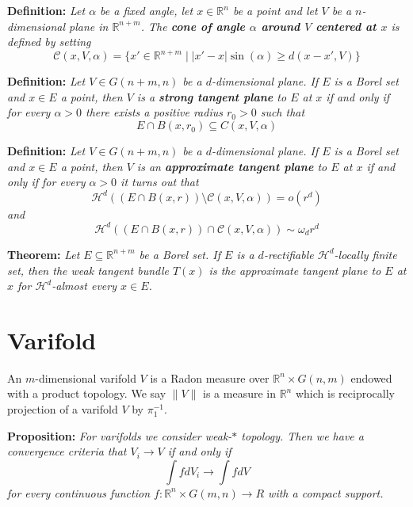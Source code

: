 \documentclass{article}
\begin{document}
\textbf{Definition:} \textit{Let $\alpha$ be a fixed angle, let $x\in\mathbb R^n$
be a point and let $V$ be a $n$-dimensional plane in $\mathbb R^{n+m}$. The \textbf{
cone of angle $\alpha$ around $V$ centered at $x$} is defined by setting
\[\mathcal C(x,V,\alpha)=\{x'\in\mathbb R^{n+m}\;|\; |x′−x|\sin(\alpha)\geq d(x−x′, V)\}\]
}

\vspace{2ex}
\textbf{Definition:} \textit{Let $V\in G(n+m, n)$ be a $d$-dimensional plane.
If $E$ is a Borel set and $x\in E$ a point, then $V$ is a \textbf{strong tangent plane}
to $E$ at $x$ if and only if for every $\alpha >0$ there exists a positive
radius $r_0 >0$ such that
\[E∩B(x, r_0)\subseteq C(x, V, \alpha)\]
}

\vspace{2ex}
\textbf{Definition:} \textit{Let $V\in G(n+m, n)$ be a $d$-dimensional plane.
If $E$ is a Borel set and $x\in E$ a point, then $V$ is an \textbf{approximate tangent
plane} to $E$ at $x$ if and only if for every $\alpha>0$ it turns out that
\[\mathcal H^d((E∩B(x,r))\setminus\mathcal C(x, V, \alpha)) = o(r^d)\]
and
\[\mathcal H^d((E∩B(x, r))∩\mathcal C(x, V, α))\sim \omega_dr^d\]
}

\textbf{Theorem:} \textit{Let $E\subseteq\mathbb R^{n+m}$ be a Borel set. If $E$
is a $d$-rectifiable $\mathcal H^d$-locally finite set, then the weak tangent
bundle $T(x)$ is the approximate tangent plane to $E$ at $x$ for $\mathcal H^d$-almost
every $x\in E$.}




\section{Varifold}

An $m$-dimensional varifold $V$ is a Radon measure over $\mathbb{R}^n\times
G(n,m)$ endowed with a product topology. We say $\|V\|$ is a measure in
$\mathbb{R}^n$ which is reciprocally projection of a varifold $V$ by $\pi_1^{-1}$.

\vspace{2ex}
\textbf{Proposition:} \textit{For varifolds we consider weak-$*$ topology. Then we have a
convergence criteria that $V_i\rightarrow V$ if and only if
\[\int fdV_i\rightarrow\int fdV\]
for every continuous function $f:\mathbb{R}^n\times G(m,n)\rightarrow R$ with a
compact support.}
\vspace{1ex}

\medskip


\end{document}
